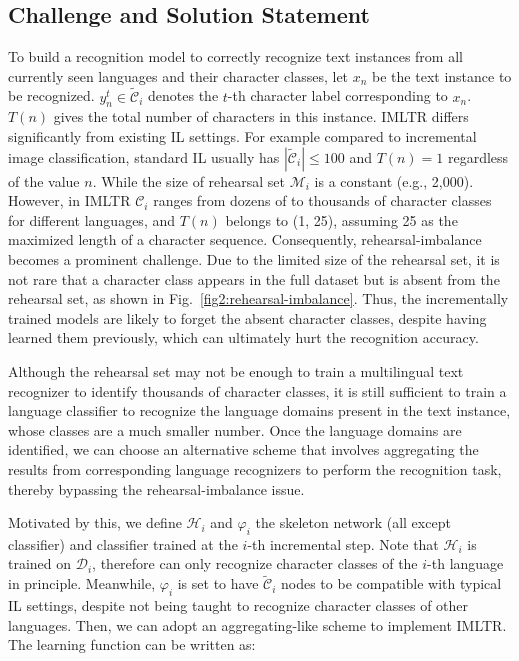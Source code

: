 \documentclass[10pt,twocolumn,letterpaper]{article}
\begin{document}
\subsection{Challenge and Solution Statement}

To build a recognition model to correctly recognize text instances from all currently seen languages and their character classes, let $x_{n}$ be the text instance to be recognized. $y_{n}^{t} \in \tilde{\mathcal{C}}_{i}$ denotes the $t$-th character label corresponding to $x_{n}$. $T(n)$ gives the total number of characters in this instance. 
IMLTR differs significantly from existing IL settings. For example compared to incremental image classification, standard IL usually has $|\tilde{\mathcal{C}}_{i}| \leq 100$ and $T(n)=1$ regardless of the value $n$. While the size of rehearsal set $\mathcal{M}_i$ is a constant (e.g., 2,000). However, in IMLTR $\mathcal{C}_{i}$ ranges from dozens of to thousands of character classes for different languages, and $T(n)$ belongs to (1, 25), assuming 25 as the maximized length of a character sequence.
Consequently, rehearsal-imbalance becomes a prominent challenge. Due to the limited size of the rehearsal set, it is not rare that a character class appears in the full dataset but is absent from the rehearsal set, as shown in Fig.~\ref{fig2:rehearsal-imbalance}. Thus, the incrementally trained models are likely to forget the absent character classes, despite having learned them previously, which can ultimately hurt the recognition accuracy.




Although the rehearsal set may not be enough to train a multilingual text recognizer to identify thousands of character classes, it is still sufficient to train a language classifier to recognize the language domains present in the text instance, whose classes are a much smaller number. Once the language domains are identified, we can choose an alternative scheme that involves aggregating the results from corresponding language recognizers to perform the recognition task, thereby bypassing the rehearsal-imbalance issue.

Motivated by this, we define $\mathcal{H}_{i}$ and $\varphi_{i}$ the skeleton network (all except classifier) and classifier trained at the $i$-th incremental step. Note that $\mathcal{H}_{i}$ is trained on $\mathcal{D}_{i}$, therefore can only recognize character classes of the $i$-th language in principle. Meanwhile, $\varphi_{i}$ is set to have $\tilde{\mathcal{C}}_{i}$ nodes to be compatible with typical IL settings, despite not being taught to recognize character classes of other languages. Then, we can adopt an aggregating-like scheme to implement IMLTR. The learning function can be written as:
\end{document}
